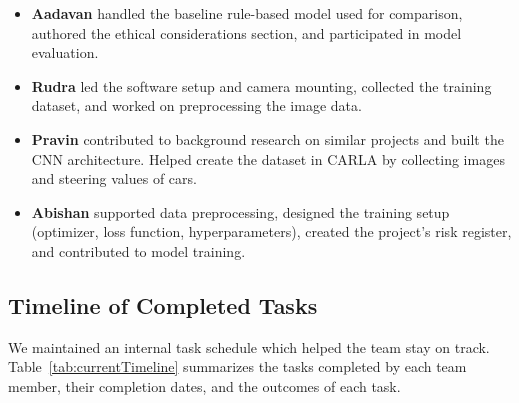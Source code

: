 \documentclass{article} %
\begin{document}
\begin{itemize}
  \item \textbf{Aadavan} handled the baseline rule-based model used for comparison, authored the ethical considerations section, and participated in model evaluation.

  \item \textbf{Rudra} led the software setup and camera mounting, collected the training dataset, and worked on preprocessing the image data.

  \item \textbf{Pravin} contributed to background research on similar projects and built the CNN architecture. Helped create the dataset in CARLA by collecting images and steering values of cars.

  \item \textbf{Abishan} supported data preprocessing, designed the training setup (optimizer, loss function, hyperparameters), created the project's risk register, and contributed to model training.
\end{itemize}

\subsection{Timeline of Completed Tasks}

We maintained an internal task schedule which helped the team stay on track. Table~\ref{tab:currentTimeline} summarizes the tasks completed by each team member, their completion dates, and the outcomes of each task.
\end{document}
